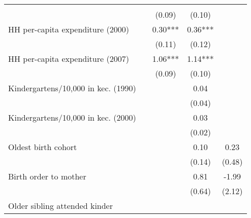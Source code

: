 \begin{tabular}{lllll}
  \multicolumn{1}{c}{} \\
\multicolumn{1}{l}{} &
  \multicolumn{1}{c}{} &
  \multicolumn{1}{c}{(0.09)} &
  \multicolumn{1}{c}{(0.10)} &
  \multicolumn{1}{c}{} \\
\multicolumn{1}{l}{HH per-capita expenditure (2000)} &
  \multicolumn{1}{c}{} &
  \multicolumn{1}{c}{0.30***} &
  \multicolumn{1}{c}{0.36***} &
  \multicolumn{1}{c}{} \\
\multicolumn{1}{l}{} &
  \multicolumn{1}{c}{} &
  \multicolumn{1}{c}{(0.11)} &
  \multicolumn{1}{c}{(0.12)} &
  \multicolumn{1}{c}{} \\
\multicolumn{1}{l}{HH per-capita expenditure (2007)} &
  \multicolumn{1}{c}{} &
  \multicolumn{1}{c}{1.06***} &
  \multicolumn{1}{c}{1.14***} &
  \multicolumn{1}{c}{} \\
\multicolumn{1}{l}{} &
  \multicolumn{1}{c}{} &
  \multicolumn{1}{c}{(0.09)} &
  \multicolumn{1}{c}{(0.10)} &
  \multicolumn{1}{c}{} \\
\multicolumn{1}{l}{Kindergartens/10,000 in kec. (1990)} &
  \multicolumn{1}{c}{} &
  \multicolumn{1}{c}{} &
  \multicolumn{1}{c}{0.04 } &
  \multicolumn{1}{c}{} \\
\multicolumn{1}{l}{} &
  \multicolumn{1}{c}{} &
  \multicolumn{1}{c}{} &
  \multicolumn{1}{c}{(0.04)} &
  \multicolumn{1}{c}{} \\
\multicolumn{1}{l}{Kindergartens/10,000 in kec. (2000)} &
  \multicolumn{1}{c}{} &
  \multicolumn{1}{c}{} &
  \multicolumn{1}{c}{0.03 } &
  \multicolumn{1}{c}{} \\
\multicolumn{1}{l}{} &
  \multicolumn{1}{c}{} &
  \multicolumn{1}{c}{} &
  \multicolumn{1}{c}{(0.02)} &
  \multicolumn{1}{c}{} \\
\multicolumn{1}{l}{Oldest birth cohort} &
  \multicolumn{1}{c}{} &
  \multicolumn{1}{c}{} &
  \multicolumn{1}{c}{0.10 } &
  \multicolumn{1}{c}{0.23 } \\
\multicolumn{1}{l}{} &
  \multicolumn{1}{c}{} &
  \multicolumn{1}{c}{} &
  \multicolumn{1}{c}{(0.14)} &
  \multicolumn{1}{c}{(0.48)} \\
\multicolumn{1}{l}{Birth order to mother} &
  \multicolumn{1}{c}{} &
  \multicolumn{1}{c}{} &
  \multicolumn{1}{c}{0.81 } &
  \multicolumn{1}{c}{-1.99 } \\
\multicolumn{1}{l}{} &
  \multicolumn{1}{c}{} &
  \multicolumn{1}{c}{} &
  \multicolumn{1}{c}{(0.64)} &
  \multicolumn{1}{c}{(2.12)} \\
\multicolumn{1}{l}{Older sibling attended kinder} &
  \multicolumn{1}{c}{} &
  \multicolumn{1}{c}{} &

\end{tabular}
